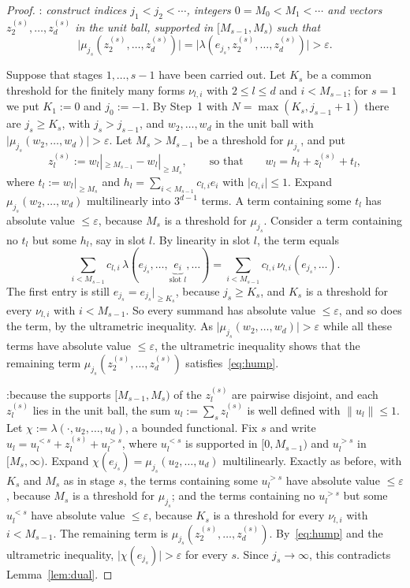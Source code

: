 \documentclass[11pt]{amsart}
\theoremstyle{remark}
\newenvironment{stepclaim}[1]{\par\smallskip\noindent\underline{\smash{Step #1}}:\enspace\itshape\ignorespaces}{\par}
\newenvironment{stepproof}{\begin{list}{}{\setlength{\leftmargin}{1.5em}\setlength{\rightmargin}{0pt}%
  \setlength{\topsep}{2pt}\setlength{\partopsep}{0pt}\setlength{\parsep}{0pt}\setlength{\itemsep}{0pt}%
  \setlength{\listparindent}{\parindent}}\item\relax}{\end{list}\smallskip}
\newcommand{\abs}[1]{\lvert #1\rvert}
\newcommand{\norm}[1]{\lVert #1\rVert}
\newcommand{\1}{\mathbf{1}}
\newcommand{\tail}[2]{#2|_{\ge #1}}
\begin{document}
\begin{proof}
\begin{stepclaim}{2}
construct indices $j_1<j_2<\cdots$, integers $0=M_0<M_1<\cdots$ and vectors $z^{(s)}_2,\dots,z^{(s)}_d$ in the unit ball, supported in
$[M_{s-1},M_s)$ such that
\begin{equation}\label{eq:hump}
\abs{\mu_{j_s}(z^{(s)}_2,\dots,z^{(s)}_d)}=\abs{\lambda(e_{j_s},z^{(s)}_2,\dots,z^{(s)}_d)}>\varepsilon .
\end{equation}
\end{stepclaim}
\begin{stepproof}
Suppose that stages $1,\dots,s-1$ have been carried out. Let $K_s$ be a common threshold for the finitely many forms
$\nu_{l,i}$ with $2\le l\le d$ and $i<M_{s-1}$; for $s=1$ we put $K_1:=0$ and $j_0:=-1$. By Step~1 with
$N=\max(K_s,j_{s-1}+1)$ there are $j_s\ge K_s$, with $j_s>j_{s-1}$, and
$w_2,\dots,w_d$ in the unit ball with $\abs{\mu_{j_s}(w_2,\dots,w_d)}>\varepsilon$. Let $M_s>M_{s-1}$ be a threshold for $\mu_{j_s}$, and put
\[
z^{(s)}_l:=\tail{M_{s-1}}{w_l}-\tail{M_s}{w_l},\qquad\text{so that}\qquad w_l=h_l+z^{(s)}_l+t_l ,
\]
where $t_l:=\tail{M_s}{w_l}$ and $h_l=\sum_{i<M_{s-1}}c_{l,i}e_i$ with $\abs{c_{l,i}}\le1$. Expand $\mu_{j_s}(w_2,\dots,w_d)$ multilinearly into $3^{d-1}$ terms. A term containing some $t_l$ has absolute value
$\le\varepsilon$, because $M_s$ is a threshold for $\mu_{j_s}$. Consider a term containing no $t_l$ but
some $h_l$, say in slot $l$. By linearity in slot $l$, the term equals
\[
\sum_{i<M_{s-1}}c_{l,i}\,\lambda(e_{j_s},\dots,\underbrace{e_i}_{\text{slot }l},\dots)
=\sum_{i<M_{s-1}}c_{l,i}\,\nu_{l,i}(e_{j_s},\dots).
\]
The first entry is still
$e_{j_s}=\tail{K_s}{e_{j_s}}$, because $j_s\ge K_s$, and $K_s$ is a threshold for every $\nu_{l,i}$ with $i<M_{s-1}$. So every
summand has absolute value $\le\varepsilon$, and so does the term, by the ultrametric inequality. As
$\abs{\mu_{j_s}(w_2,\dots,w_d)}>\varepsilon$ while all these terms have absolute value $\le\varepsilon$, the ultrametric inequality shows
that the remaining term $\mu_{j_s}(z^{(s)}_2,\dots,z^{(s)}_d)$ satisfies~\eqref{eq:hump}.
\end{stepproof}

\noindent\underline{}:\enspace because the supports $[M_{s-1},M_s)$ of the $z^{(s)}_l$ are pairwise disjoint, and each $z^{(s)}_l$ lies in the unit ball, the sum
$u_l:=\sum_sz^{(s)}_l$ is well defined with $\norm{u_l}\le1$. Let
$\chi:=\lambda(\cdot,u_2,\dots,u_d)$, a bounded functional. Fix $s$ and write $u_l=u_l^{<s}+z^{(s)}_l+u_l^{>s}$, where
$u_l^{<s}$ is supported in $[0,M_{s-1})$ and $u_l^{>s}$ in $[M_s,\infty)$. Expand
$\chi(e_{j_s})=\mu_{j_s}(u_2,\dots,u_d)$ multilinearly. Exactly as before, with $K_s$ and $M_s$ as in stage $s$, the terms
containing some $u_l^{>s}$ have absolute value $\le\varepsilon$, because $M_s$ is a threshold for $\mu_{j_s}$; and the terms containing
no $u_l^{>s}$ but some $u_l^{<s}$ have absolute value $\le\varepsilon$, because $K_s$ is a
threshold for every $\nu_{l,i}$ with $i<M_{s-1}$. The remaining term is
$\mu_{j_s}(z^{(s)}_2,\dots,z^{(s)}_d)$. By~\eqref{eq:hump} and the ultrametric inequality, $\abs{\chi(e_{j_s})}>\varepsilon$ for every
$s$. Since $j_s\to\infty$, this contradicts Lemma~\ref{lem:dual}.
\end{proof}
\end{document}

